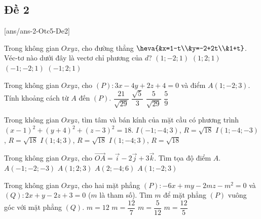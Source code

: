 \subsection{Đề 2}
[ans/ans-2-Otc5-De2]
\caulc
\begin{ex}%
	Trong không gian $Oxyz$, cho đường thẳng $\heva{&x=1-t\\&y=-2+2t\\&1+t}$. Véc-tơ nào dưới đây là vectơ chỉ phương của $d$?
	\choice
	{$(1;-2;1)$}
	{$(1;2;1)$}
	{$(-1;-2;1)$}
	{\True $(-1;2;1)$}
\end{ex}

\begin{ex}%
	Trong không gian $Oxyz$, cho $(P) \colon 3x-4y+2z+4=0$ và điểm $A(1;-2;3)$. Tính khoảng cách từ $A$ đến $(P)$.
	\choice
	{\True $\dfrac{21}{\sqrt{29}}$}
	{$\dfrac{\sqrt{5}}{3}$}
	{$\dfrac{5}{\sqrt{29}}$}
	{$\dfrac{5}{9}$}
\end{ex}

\begin{ex}%
	Trong không gian $Oxyz$, tìm tâm và bán kính của mặt cầu có phương trình $(x-1)^2+(y+4)^2+(z-3)^2=18$.
	\choice
	{$I(-1;-4;3)$, $R=\sqrt{18}$}
	{$I(1;-4;-3)$, $R=\sqrt{18}$}
	{$I(1;4;3)$, $R=\sqrt{18}$}
	{\True $I(1;-4;3)$, $R=\sqrt{18}$}
\end{ex}

\begin{ex}%
	Trong không gian $Oxyz$, cho $\overrightarrow{OA}=\overrightarrow{i}-2\overrightarrow{j}+3\overrightarrow{k}$. Tìm tọa độ điểm $A$.
	\choice
	{$A\left(-1;-2;-3\right)$}
	{$A\left(1;2;3\right)$}
	{$A\left(2;-4;6\right)$}
	{\True $A\left(1;-2;3\right)$}
\end{ex}
\begin{ex}%
	Trong không gian $Oxyz$, cho hai mặt phẳng $ (P)\colon -6x+my-2mz-m^{2}=0 $ và $ (Q)\colon 2x+y-2z+3=0 $ ($ m $ là tham số). Tìm $ m $ để mặt phẳng $ (P) $ vuông góc với mặt phẳng $ (Q) $.
	\choice
	{$ m=12 $}
	{$ m=\dfrac{12}{7} $}
	{$ m=\dfrac{5}{12} $}
	{\True $ m=\dfrac{12}{5} $}
\end{ex}

